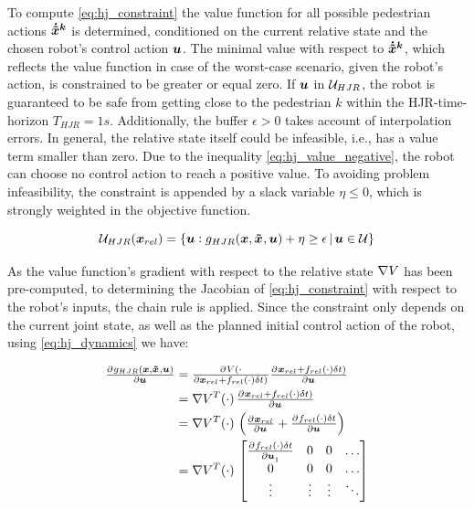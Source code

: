 To compute \ref{eq:hj_constraint} the value function for all possible pedestrian actions $\dxped[k]$ is determined, conditioned on the current relative state and the chosen robot's control action $\boldsymbol{u}$. The minimal value with respect to $\dxped[k]$, which reflects the value function in case of the worst-case scenario, given the robot's action, is constrained to be greater or equal zero. If $\boldsymbol{u}$ in $\mathcal{U}_{HJR}$, the robot is guaranteed to be safe from getting close to the pedestrian $k$ within the \ac{HJR}-time-horizon $T_{HJR} = 1s$. Additionally, the buffer $\epsilon > 0$ takes account of interpolation errors.
\newline
In general, the relative state itself could be infeasible, i.e., has a value term smaller than zero. Due to the inequality \ref{eq:hj_value_negative}, the robot can choose no control action to reach a positive value. To avoiding problem infeasibility, the constraint is appended by a slack variable $\eta \leq 0$, which is strongly weighted in the objective function.

\begin{equation}
\uset_{HJR} (\xrel) = \{ \u: g_{HJR}(\x, \xped[], \u) + \eta \geq \epsilon  \, | \, \u \in \uset \}
\end{equation}

As the value function's gradient with respect to the relative state $\nabla V$ has been pre-computed, to determining the Jacobian of \ref{eq:hj_constraint} with respect to the robot's inputs, the chain rule is applied. Since the constraint only depends on the current joint state, as well as the planned initial control action of the robot, using \ref{eq:hj_dynamics} we have:

\begin{align}
\pd{g_{HJR}(\x, \xped[], \u)}{\u} &= \pd{\Vrel(\cdot}{\xrel + \frel(\cdot) \dt)} \pd{\xrel + \frel(\cdot) \dt)}{\u} \\
&= \nabla \Vrel^T(\cdot) \, \pd{\xrel + \frel(\cdot) \dt)}{\u} \\
&= \nabla \Vrel^T(\cdot) \, \left( \pd{\xrel}{\u} + \pd{\frel(\cdot) \dt}{\u} \right) \\
&= \nabla \Vrel^T(\cdot) \, \begin{bmatrix}
\pd{\frel(\cdot) \dt}{\u_1} & 0 & 0 & \hdots \\
0 & 0 & 0 & \hdots \\
\vdots & \vdots & \vdots & \ddots \\
\end{bmatrix}
\end{align}

